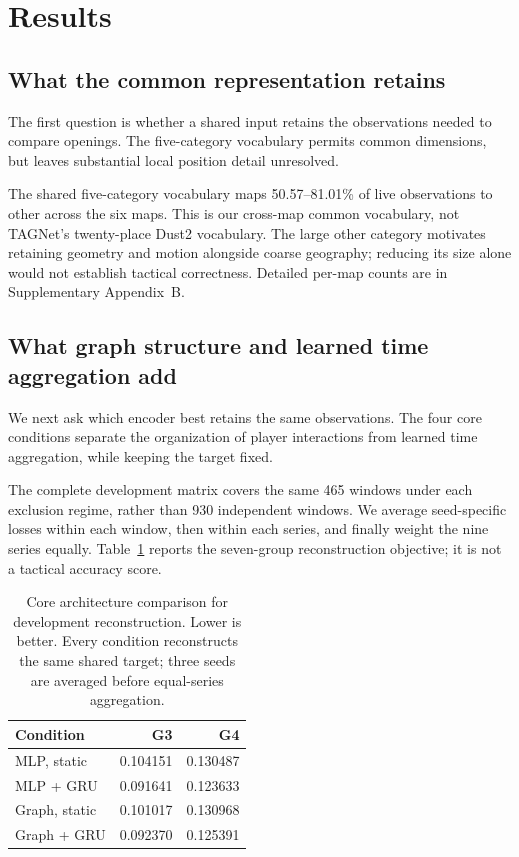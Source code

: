 \section{Results}
\subsection{What the common representation retains}
The first question is whether a shared input retains the observations needed to compare openings. The five-category vocabulary permits common dimensions, but leaves substantial local position detail unresolved.

The shared five-category vocabulary maps 50.57--81.01\% of live observations to other across the six maps. This is our cross-map common vocabulary, not TAGNet's twenty-place Dust2 vocabulary. The large other category motivates retaining geometry and motion alongside coarse geography; reducing its size alone would not establish tactical correctness. Detailed per-map counts are in Supplementary Appendix~B. %

\subsection{What graph structure and learned time aggregation add}
We next ask which encoder best retains the same observations. The four core conditions separate the organization of player interactions from learned time aggregation, while keeping the target fixed.

The complete development matrix covers the same 465 windows under each exclusion regime, rather than 930 independent windows. We average seed-specific losses within each window, then within each series, and finally weight the nine series equally. Table~\ref{tab:mainrec} reports the seven-group reconstruction objective; it is not a tactical accuracy score. %

\begin{table}[t]
\caption{Core architecture comparison for development reconstruction. Lower is better. Every condition reconstructs the same shared target; three seeds are averaged before equal-series aggregation.}
\label{tab:mainrec}
\centering\small
\begin{tabular}{lrr}
\toprule
Condition & G3 & G4\\
\midrule
MLP, static & 0.104151 & 0.130487 \\ %
MLP + GRU & 0.091641 & 0.123633 \\ %
Graph, static & 0.101017 & 0.130968 \\ %
Graph + GRU & 0.092370 & 0.125391 \\ %
\bottomrule
\end{tabular}
\end{table}

